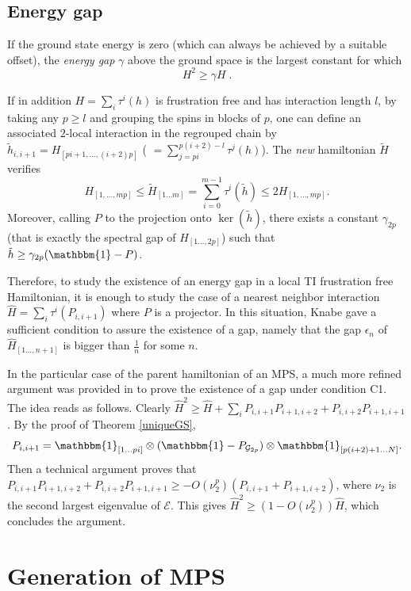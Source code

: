 \documentclass[aps,prl,epsfig,graphics,floatfix,mathbbm,a4paper]{article}
\newcommand{\G}{\mathcal{G}}
\newcommand{\E}{\mathcal{E}}
\newcommand{\1}{\mathbbm{1}}
\renewcommand{\>}{\rangle}
\newcommand{\<}{\langle}
\begin{document}
\subsection{Energy gap}\label{Sec:Hgap}

If the ground state energy is zero (which can always be achieved
by a suitable offset),  the \emph{energy gap} $\gamma$ above the
ground space is the largest constant for which
\begin{equation} H^2\geq\gamma H\;.
\end{equation}

If in addition $H=\sum_i \tau^i(h)$ is frustration free and has
interaction length $l$, by taking any $p\ge l$ and grouping the
spins in blocks of $p$, one can define an associated $2$-local
interaction in the regrouped chain by
$\tilde{h}_{i,i+1}=H_{[pi+1,\ldots, (i+2)p]}$ (
$=\sum_{j=pi}^{p(i+2)-l}\tau^j(h)$). The {\it new} hamiltonian
$\tilde{H}$ verifies $$H_{[1,\ldots, mp]}\le \tilde{H}_{[1\ldots
                    m]}=\sum_{i=0}^{m-1}\tau^i(\tilde{h})\le 2H_{[1,\ldots, mp]}.
$$
Moreover, calling $P$ to the projection onto $\ker(\tilde{h})$,
there exists a constant $\gamma_{2p}$ (that is exactly the
spectral gap of $H_{[1\ldots,2p]}$) such that $\tilde{h}\ge
    \gamma_{2p}(\1-P)$.


Therefore, to study the existence of an energy gap in a local TI
frustration free Hamiltonian, it is enough to study the case of a
nearest neighbor interaction $\hat{H}=\sum_i\tau^i(P_{i,i+1})$
where $P$ is a projector. In this situation, Knabe \cite{Knabe}
gave a sufficient condition to assure the existence of a gap,
namely that the gap $\epsilon_n$ of $\hat{H}_{[1\ldots, n+1]}$ is
bigger than $\frac{1}{n}$ for some $n$.

In the particular case of the parent hamiltonian of an MPS, a much
more refined argument was provided in \cite{FaNaWe92} to prove the
existence of a gap under condition C1. The idea reads as follows.
Clearly $\hat{H}^2\ge \hat{H}+ \sum_{i} P_{i,i+1}P_{i+1, i+2}+
    P_{i,i+2}P_{i+1, i+1}$. By the proof of Theorem \ref{uniqueGS},
$$P_{i,i+1}=\1_{[1\ldots pi]}\otimes (\1-P_{\G_{2p}}) \otimes \1_{[p(i+2)+1\ldots N]}.$$
Then a technical argument proves that $P_{i,i+1}P_{i+1, i+2}+
    P_{i,i+2}P_{i+1, i+1}\ge -O(\nu_2^p)( P_{i,i+1}+ P_{i+1, i+2})$,
where $\nu_2$ is the second largest eigenvalue of $\E$. This gives
$\hat{H}^2\ge(1-O(\nu_2^p))\hat{H}$, which concludes the argument.



\section{Generation of MPS}\label{sec:generation}
\end{document}

